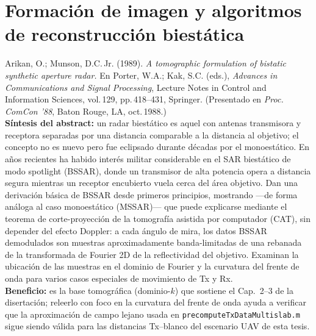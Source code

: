 \documentclass[11pt,a4paper]{article}
\begin{document}
\section{Formación de imagen y algoritmos de reconstrucción biestática}
\label{sec:algoritmos}

\begin{enumerate}[label=\textbf{[B\arabic*]}, leftmargin=2.2cm, itemsep=10pt]

\item Arikan, O.; Munson, D.C.\,Jr. (1989). \textit{A tomographic
formulation of bistatic synthetic aperture radar.} En Porter, W.A.; Kak,
S.C. (eds.), \emph{Advances in Communications and Signal Processing},
Lecture Notes in Control and Information Sciences, vol.\,129, pp.\,418--431,
Springer. (Presentado en \emph{Proc. ComCon '88}, Baton Rouge, LA, oct.\,1988.)
\cite{arikan1989}\\
\textbf{Síntesis del abstract:} un radar biestático es aquel con antenas
transmisora y receptora separadas por una distancia comparable a la
distancia al objetivo; el concepto no es nuevo pero fue eclipsado durante
décadas por el monoestático. En años recientes ha habido interés militar
considerable en el SAR biestático de modo spotlight (BSSAR), donde un
transmisor de alta potencia opera a distancia segura mientras un receptor
encubierto vuela cerca del área objetivo. Dan una derivación básica de
BSSAR desde primeros principios, mostrando —de forma análoga al caso
monoestático (MSSAR)— que puede explicarse mediante el teorema de
corte-proyección de la tomografía asistida por computador (CAT), sin
depender del efecto Doppler: a cada ángulo de mira, los datos BSSAR
demodulados son muestras aproximadamente banda-limitadas de una rebanada de
la transformada de Fourier 2D de la reflectividad del objetivo. Examinan la
ubicación de las muestras en el dominio de Fourier y la curvatura del
frente de onda para varios casos especiales de movimiento de Tx y Rx.\\
\textbf{Beneficio:} es la base tomográfica (dominio-$k$) que sostiene el
Cap.~2--3 de la disertación; releerlo con foco en la curvatura del frente
de onda ayuda a verificar que la aproximación de campo lejano usada en
\texttt{precomputeTxDataMultislab.m} sigue siendo válida para las
distancias Tx--blanco del escenario UAV de esta tesis.


\end{enumerate}
\end{document}
